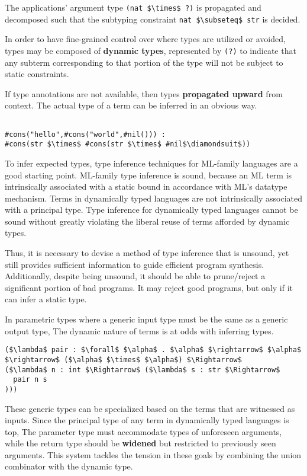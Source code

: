 \documentclass[sigplan,screen]{acmart}
\begin{document}
\noindent The  applications' argument type \lstinline{(nat $\times$ ?)} 
is propagated and decomposed such that the subtyping constraint 
\lstinline{nat $\subseteq$ str} is decided. 

In order to have fine-grained control over where types are utilized or avoided, 
types may be composed of \textbf{dynamic types}, represented by \lstinline{(?)} to indicate 
that any subterm corresponding to that portion of the type 
will not be subject to static constraints.

If type annotations are not available, then types \textbf{propagated upward} from context. 
The actual type of a term can be inferred in an obvious way.

\begin{lstlisting}

#cons("hello",#cons("world",#nil())) : 
#cons(str $\times$ #cons(str $\times$ #nil$\diamondsuit$))

\end{lstlisting}

To infer expected types, type inference techniques for ML-family languages 
are a good starting point.
ML-family type inference is sound, because an ML term is 
intrinsically associated with a static bound in accordance with ML's datatype mechanism.
Terms in dynamically typed languages are not intrinsically associated with a principal type. 
Type inference for dynamically typed languages cannot be sound without greatly violating the 
liberal reuse of terms afforded by dynamic types. 

Thus, it is necessary to devise a method of type inference that is unsound, 
yet still provides sufficient information to guide efficient program synthesis.
Additionally, despite being unsound, it should be able to prune/reject 
a significant portion of bad programs. 
It may reject good programs, but only if it can infer a static type.

In parametric types where a generic input type must be the same as a generic output type,
The dynamic nature of terms is at odds with inferring types.

\begin{lstlisting}
($\lambda$ pair : $\forall$ $\alpha$ . $\alpha$ $\rightarrow$ $\alpha$ $\rightarrow$ ($\alpha$ $\times$ $\alpha$) $\Rightarrow$ 
($\lambda$ n : int $\Rightarrow$ ($\lambda$ s : str $\Rightarrow$ 
  pair n s
)))
\end{lstlisting}

\noindent These generic types can be specialized based on the terms that are witnessed as inputs. 
Since the principal type of any term in dynamically typed languages is top, 
The parameter type must accommodate types of unforeseen arguments, 
while the return type should be \textbf{widened} but restricted 
to previously seen arguments.
This system tackles the tension in these goals by combining the union combinator  
with the dynamic type. 
\end{document}
